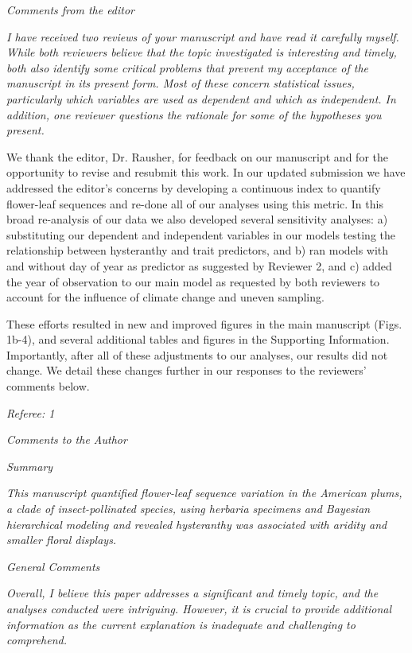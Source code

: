 \documentclass{article}[12pt]
\begin{document}


\emph{Comments from the editor}

\emph{I have received two reviews of your manuscript and have read it carefully myself.  While both reviewers believe that the topic investigated is interesting and timely, both also identify some critical problems that prevent my acceptance of the manuscript in its present form.  Most of these concern statistical issues, particularly which variables are used as dependent and which as independent.  In addition, one reviewer questions the rationale for some of the hypotheses you present.}

We thank the editor, Dr. Rausher, for feedback on our manuscript and for the opportunity to revise and resubmit this work. In our updated submission we have addressed the editor's concerns by developing a continuous index to quantify flower-leaf sequences and re-done all of our analyses using this metric. In this broad re-analysis of our data we also developed several sensitivity analyses: a) substituting our dependent and independent variables in our models testing the relationship between hysteranthy and trait predictors, and b) ran models with and without day of year as predictor as suggested by Reviewer 2, and c) added the year of observation to our main model as requested by both reviewers to account for the influence of climate change and uneven sampling. 

These efforts resulted in  new and improved figures in the main manuscript (Figs. 1b-4), and several additional tables and figures in the Supporting Information. Importantly, after all of these adjustments to our analyses, our results did not change. We detail these changes further in our responses to the reviewers' comments below.

\emph{Referee: 1}

\emph{Comments to the Author}

\emph{Summary}

\emph{This manuscript quantified flower-leaf sequence variation in the American plums, a clade of insect-pollinated species, using herbaria specimens and Bayesian hierarchical modeling and revealed hysteranthy was associated with aridity and smaller floral displays.}

\emph{General Comments}

\emph{Overall, I believe this paper addresses a significant and timely topic, and the analyses conducted were intriguing. However, it is crucial to provide additional information as the current explanation is inadequate and challenging to comprehend.}
\end{document}
